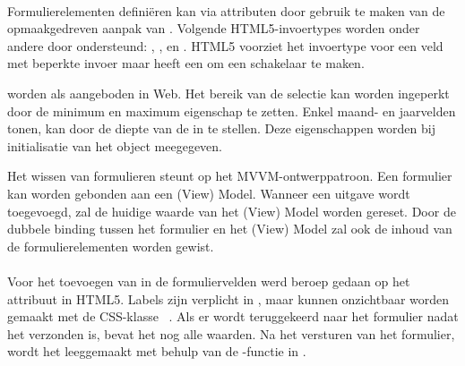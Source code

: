 \paragraph{\kendo}
 Formulierelementen definiëren kan via attributen door gebruik te maken van de opmaakgedreven aanpak van \kendo.
 Volgende HTML5-invoertypes worden onder andere door \kendo{} ondersteund:  , ,  en .
 HTML5 voorziet het invoertype  voor een veld met beperkte invoer maar \kendo{} heeft een  om een schakelaar te maken.

  worden als  aangeboden in \kendo{} Web.
 Het bereik van de selectie kan worden ingeperkt door de minimum en maximum eigenschap te zetten.
 Enkel maand- en jaarvelden tonen, kan door de diepte van de  in te stellen.
 Deze eigenschappen worden bij initialisatie van het object meegegeven.
 
 Het wissen van formulieren steunt op het MVVM-ontwerppatroon.
 Een formulier kan worden gebonden aan een (View) Model.
 Wanneer een uitgave wordt toegevoegd, zal de huidige waarde van het (View) Model worden gereset.
 Door de dubbele binding tussen het formulier en het (View) Model zal ook de inhoud van de formulierelementen worden gewist.
 
\paragraph{\jqm} 
Voor het toevoegen van  in de formuliervelden werd beroep gedaan op het  attribuut in HTML5. 
Labels zijn verplicht in \jqm{}, maar kunnen onzichtbaar worden gemaakt met de CSS-klasse ~\cite{JQuery2013}. 
Als er wordt teruggekeerd naar het formulier nadat het verzonden is, bevat het nog alle waarden. 
Na het versturen van het formulier, wordt het leeggemaakt met behulp van de -functie in \js{}.
 
